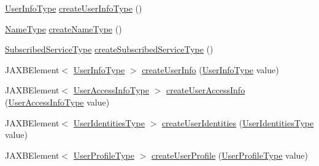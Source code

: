 \begin{DoxyCompactItemize}
\item 
\hyperlink{classcom_1_1telefonica_1_1schemas_1_1unica_1_1rest_1_1directory_1_1v1_1_1UserInfoType}{UserInfoType} \hyperlink{classcom_1_1telefonica_1_1schemas_1_1unica_1_1rest_1_1directory_1_1v1_1_1ObjectFactory_ab12dafa50d383d6ed518159b598ea297}{createUserInfoType} ()
\item 
\hyperlink{classcom_1_1telefonica_1_1schemas_1_1unica_1_1rest_1_1directory_1_1v1_1_1NameType}{NameType} \hyperlink{classcom_1_1telefonica_1_1schemas_1_1unica_1_1rest_1_1directory_1_1v1_1_1ObjectFactory_a3fd77d718de5663c808c07fec29399ea}{createNameType} ()
\item 
\hyperlink{classcom_1_1telefonica_1_1schemas_1_1unica_1_1rest_1_1directory_1_1v1_1_1SubscribedServiceType}{SubscribedServiceType} \hyperlink{classcom_1_1telefonica_1_1schemas_1_1unica_1_1rest_1_1directory_1_1v1_1_1ObjectFactory_a0ec12d1fd452b70a3b709a3a249db57c}{createSubscribedServiceType} ()
\item 
JAXBElement$<$ \hyperlink{classcom_1_1telefonica_1_1schemas_1_1unica_1_1rest_1_1directory_1_1v1_1_1UserInfoType}{UserInfoType} $>$ \hyperlink{classcom_1_1telefonica_1_1schemas_1_1unica_1_1rest_1_1directory_1_1v1_1_1ObjectFactory_a9afbbf7e2f5a284c3db8657162bce9df}{createUserInfo} (\hyperlink{classcom_1_1telefonica_1_1schemas_1_1unica_1_1rest_1_1directory_1_1v1_1_1UserInfoType}{UserInfoType} value)
\item 
JAXBElement$<$ \hyperlink{classcom_1_1telefonica_1_1schemas_1_1unica_1_1rest_1_1directory_1_1v1_1_1UserAccessInfoType}{UserAccessInfoType} $>$ \hyperlink{classcom_1_1telefonica_1_1schemas_1_1unica_1_1rest_1_1directory_1_1v1_1_1ObjectFactory_ae29f91baa40f31403604aeb9154745e0}{createUserAccessInfo} (\hyperlink{classcom_1_1telefonica_1_1schemas_1_1unica_1_1rest_1_1directory_1_1v1_1_1UserAccessInfoType}{UserAccessInfoType} value)
\item 
JAXBElement$<$ \hyperlink{classcom_1_1telefonica_1_1schemas_1_1unica_1_1rest_1_1directory_1_1v1_1_1UserIdentitiesType}{UserIdentitiesType} $>$ \hyperlink{classcom_1_1telefonica_1_1schemas_1_1unica_1_1rest_1_1directory_1_1v1_1_1ObjectFactory_a1e45690137de2177798c71138948e894}{createUserIdentities} (\hyperlink{classcom_1_1telefonica_1_1schemas_1_1unica_1_1rest_1_1directory_1_1v1_1_1UserIdentitiesType}{UserIdentitiesType} value)
\item 
JAXBElement$<$ \hyperlink{classcom_1_1telefonica_1_1schemas_1_1unica_1_1rest_1_1directory_1_1v1_1_1UserProfileType}{UserProfileType} $>$ \hyperlink{classcom_1_1telefonica_1_1schemas_1_1unica_1_1rest_1_1directory_1_1v1_1_1ObjectFactory_a2232a571deb3e468c6e0fb3415149318}{createUserProfile} (\hyperlink{classcom_1_1telefonica_1_1schemas_1_1unica_1_1rest_1_1directory_1_1v1_1_1UserProfileType}{UserProfileType} value)

\end{DoxyCompactItemize}
